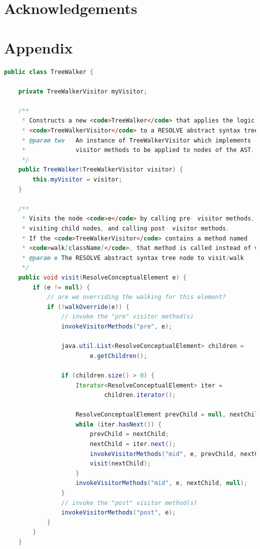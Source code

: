 \documentclass[times]{speauth}
\begin{document}
\section{Acknowledgements}




\newpage
\section{Appendix} \label{app:codelistings}
\begin{lstlisting}[language=java,caption={TreeWalker.java}]
public class TreeWalker {

    private TreeWalkerVisitor myVisitor;

    /**
     * Constructs a new <code>TreeWalker</code> that applies the logic of
     * <code>TreeWalkerVisitor</code> to a RESOLVE abstract syntax tree.
     * @param twv	An instance of TreeWalkerVisitor which implements
     * 				visitor methods to be applied to nodes of the AST.
     */
    public TreeWalker(TreeWalkerVisitor visitor) {
        this.myVisitor = visitor;
    }

    /**
     * Visits the node <code>e</code> by calling pre- visitor methods, recursively
     * visiting child nodes, and calling post- visitor methods.
     * If the <code>TreeWalkerVisitor</code> contains a method named
     * <code>walk[className]</code>, that method is called instead of visiting the children.
     * @param e	The RESOLVE abstract syntax tree node to visit/walk
     */
    public void visit(ResolveConceptualElement e) {
        if (e != null) {
            // are we overriding the walking for this element?
            if (!walkOverride(e)) {
                // invoke the "pre" visitor method(s)
                invokeVisitorMethods("pre", e);

                java.util.List<ResolveConceptualElement> children =
                        e.getChildren();

                if (children.size() > 0) {
                    Iterator<ResolveConceptualElement> iter =
                            children.iterator();

                    ResolveConceptualElement prevChild = null, nextChild = null;
                    while (iter.hasNext()) {
                        prevChild = nextChild;
                        nextChild = iter.next();
                        invokeVisitorMethods("mid", e, prevChild, nextChild);
                        visit(nextChild);
                    }
                    invokeVisitorMethods("mid", e, nextChild, null);
                }
                // invoke the "post" visitor method(s)
                invokeVisitorMethods("post", e);
            }
        }
    }


\end{lstlisting}
\end{document}
